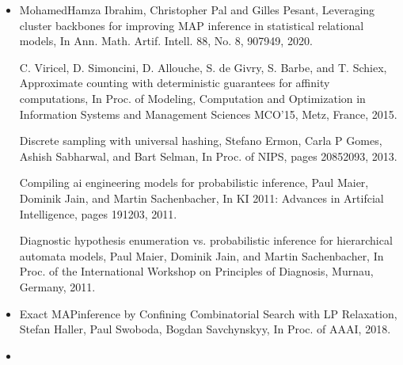 \documentclass[letterpaper,10pt,openany,oneside,english]{sphinxmanual}
\begin{document}
\begin{itemize}
\sphinxAtStartPar
A weighted csp approach to cost\sphinxhyphen{}optimal planning,
Martin C Cooper, Marie de Roquemaurel, and Pierre Régnier,
Ai Communications, 24(1):1\sphinxhyphen{}29, 2011.

\sphinxAtStartPar
Point\sphinxhyphen{}based backup for decentralized POMDPs: Complexity and new algorithms,
Akshat Kumar and Shlomo Zilberstein,
In Proceedings of the 9th International Conference on Autonomous Agents and Multiagent Systems, 1:1315\sphinxhyphen{}1322, 2010.

\item {} 
\sphinxAtStartPar
{}

\sphinxAtStartPar
Mohamed\sphinxhyphen{}Hamza Ibrahim, Christopher Pal and Gilles Pesant,
Leveraging cluster backbones for improving MAP inference in statistical relational models,
In Ann. Math. Artif. Intell. 88, No. 8, 907\sphinxhyphen{}949, 2020.

\sphinxAtStartPar
C. Viricel, D. Simoncini, D. Allouche, S. de Givry, S. Barbe, and T. Schiex,
Approximate counting with deterministic guarantees for affinity computations,
In Proc. of Modeling, Computation and Optimization in Information Systems and Management Sciences \sphinxhyphen{} MCO’15, Metz, France, 2015.

\sphinxAtStartPar
Discrete sampling with universal hashing,
Stefano Ermon, Carla P Gomes, Ashish Sabharwal, and Bart Selman,
In Proc. of NIPS, pages 2085\sphinxhyphen{}2093, 2013.

\sphinxAtStartPar
Compiling ai engineering models for probabilistic inference,
Paul Maier, Dominik Jain, and Martin Sachenbacher,
In KI 2011: Advances in Artifcial Intelligence, pages 191\sphinxhyphen{}203, 2011.

\sphinxAtStartPar
Diagnostic hypothesis enumeration vs. probabilistic inference for hierarchical automata models,
Paul Maier, Dominik Jain, and Martin Sachenbacher,
In Proc. of the International Workshop on Principles of Diagnosis, Murnau, Germany, 2011.

\item {} 
\sphinxAtStartPar
{}

\sphinxAtStartPar
Exact MAP\sphinxhyphen{}inference by Confining Combinatorial Search with LP Relaxation,
Stefan Haller, Paul Swoboda, Bogdan Savchynskyy,
In Proc. of AAAI, 2018.

\item {} 
\sphinxAtStartPar
{}


\end{itemize}
\end{document}
